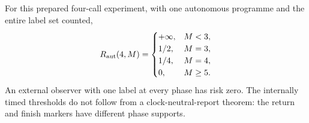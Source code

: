 \begin{theorem}\label{thm:finite_reuse}
For this prepared four-call experiment, with one autonomous programme and the entire label set counted,
\begin{equation}\label{eq:finite_reuse}
 R_{\mathrm{aut}}(4,M)=
 \begin{cases}
 +\infty,&M<3,\\
 1/2,&M=3,\\
 1/4,&M=4,\\
 0,&M\ge5.
 \end{cases}
\end{equation}
An external observer with one label at every phase has risk zero. The internally timed thresholds do not follow from a clock-neutral-report theorem: the return and finish markers have different phase supports.
\end{theorem}
